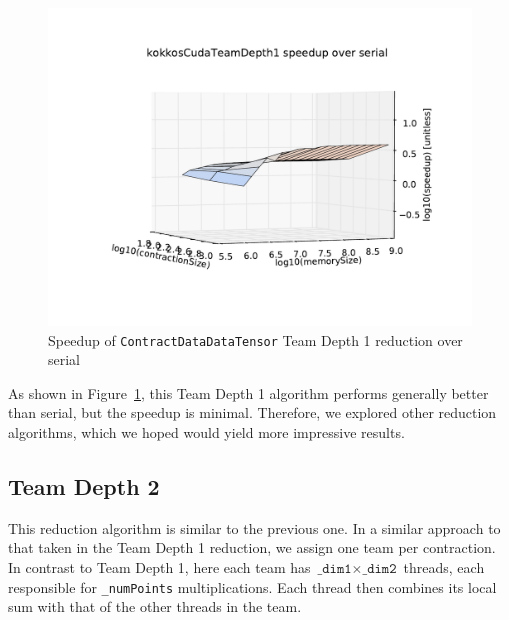 \begin{figure}[ht]
    \begin{centering}
    \includegraphics[scale=.55]{./VersusSerial_kokkosCudaTeamDepth1_clearCache_shadowfax}
\end{centering}
    \caption[Performance of \texttt{ContractDataDataTensor} Team Depth
    1]{Speedup of \texttt{ContractDataDataTensor} Team Depth 1 reduction over
    serial
\label{fig:ContractDataDataTensorDepth1}} 
\end{figure}

As shown in Figure~\ref{fig:ContractDataDataTensorDepth1}, this Team Depth 1
algorithm performs generally better than serial, but the speedup is minimal.
Therefore, we explored other reduction algorithms, which we hoped would yield
more impressive results.

\subsection{Team Depth 2}
    This reduction algorithm is similar to the previous one.  In a similar
    approach to that taken in the Team Depth 1 reduction, we assign one team per
    contraction.  In contrast to Team Depth 1, here each team has
    $\texttt{\_dim1} \times \texttt{\_dim2}$ threads, each responsible for
    \texttt{\_numPoints} multiplications.  Each thread then combines its local
    sum with that of the other threads in the team.

